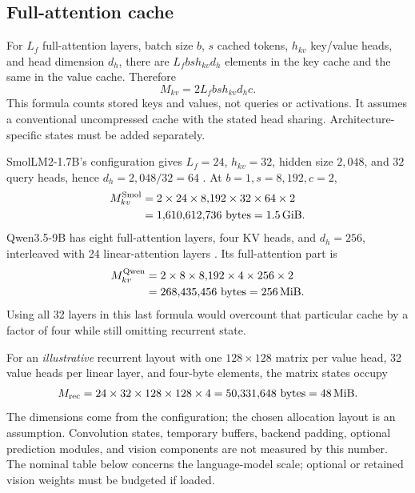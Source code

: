\documentclass[11pt]{article}
\newcommand{\GiB}{\,\mathrm{GiB}}
\begin{document}
\subsection{Full-attention cache}
For $L_f$ full-attention layers, batch size $b$, $s$ cached tokens, $h_{kv}$ key/value heads, and head dimension $d_h$, there are $L_f b s h_{kv}d_h$ elements in the key cache and the same in the value cache. Therefore
\begin{equation}\label{eq:kv}
M_{kv}=2L_f b s h_{kv}d_h c.
\end{equation}
This formula counts stored keys and values, not queries or activations. It assumes a conventional uncompressed cache with the stated head sharing. Architecture-specific states must be added separately.

SmolLM2-1.7B's configuration gives $L_f=24$, $h_{kv}=32$, hidden size $2{,}048$, and $32$ query heads, hence $d_h=2{,}048/32=64$ \citep{smol}. At $b=1,s=8{,}192,c=2$,
\begin{align}
M_{kv}^{\rm Smol}&=2\times24\times8{,}192\times32\times64\times2\\
&=1{,}610{,}612{,}736\ \mathrm{bytes}=1.5\GiB.
\end{align}
Qwen3.5-9B has eight full-attention layers, four KV heads, and $d_h=256$, interleaved with 24 linear-attention layers \citep{qwen}. Its full-attention part is
\begin{align}
M_{kv}^{\rm Qwen}&=2\times8\times8{,}192\times4\times256\times2\\
&=268{,}435{,}456\ \mathrm{bytes}=256\,\mathrm{MiB}.
\end{align}
Using all 32 layers in this last formula would overcount that particular cache by a factor of four while still omitting recurrent state.

For an \emph{illustrative} recurrent layout with one $128\times128$ matrix per value head, 32 value heads per linear layer, and four-byte elements, the matrix states occupy
\begin{equation}
M_{\rm rec}=24\times32\times128\times128\times4=50{,}331{,}648\ \mathrm{bytes}=48\,\mathrm{MiB}.
\end{equation}
The dimensions come from the configuration; the chosen allocation layout is an assumption. Convolution states, temporary buffers, backend padding, optional prediction modules, and vision components are not measured by this number. The nominal table below concerns the language-model scale; optional or retained vision weights must be budgeted if loaded.
\end{document}
